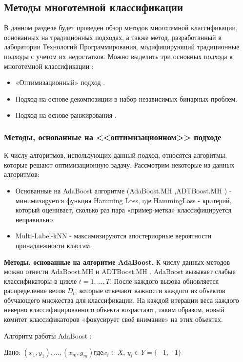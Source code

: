 \documentclass[russian, utf8, emptystyle]{eskdtext}
\begin{document}
\subsection{Методы многотемной классификации}
В данном разделе будет проведен обзор методов многотемной классификации, основанных на традиционных подходах, а также метод, разработанный в лаборатории Технологий Программирования, модифицирующий традиционные подходы с учетом их недостатков.
Можно выделить три основных подхода к многотемной классификации \cite{dis}:
\begin{itemize}
	\item «Оптимизационный» подход \cite{AdaBoost,ADT,mlKNN}.
	\item Подход на основе декомпозиции в набор независимых бинарных проблем. 
	\item Подход на основе ранжирования \cite{rank1,rank2}.
\end{itemize}
	\subsubsection{Методы, основанные на <<оптимизационном>> подходе}
К числу алгоритмов, использующих данный подход, относятся алгоритмы, которые решают оптимизационную задачу. Рассмотрим некоторые из данных алгоритмов:
\begin{itemize}
	\item Основанные на AdaBoost алгоритме (AdaBoost.MH \cite{AdaBoost},ADTBoost.MH \cite{ADT}) - минимизируется функция Hamming Loss, где HammingLoss - критерий, который   оценивает, сколько раз пара «пример-метка» классифицируется неправильно. 
	\item Multi-Label-kNN - \cite{kNN} максимизируются апостериорные вероятности принадлежности классам.
\end{itemize}
{\bf Методы, основанные на алгоритме AdaBoost.} К числу данных методов можно отнести AdaBoost.MH \cite{AdaBoost} и ADTBoost.MH \cite{ADT}.
AdaBoost вызывает слабые классификаторы в цикле  $t = 1,\ldots,T.$ После каждого вызова обновляется распределение весов $D_{t}$, которые отвечают важности каждого из объектов обучающего множества для классификации. На каждой итерации веса каждого неверно классифицированного объекта возрастают, таким образом, новый комитет классификаторов «фокусирует своё внимание» на этих объектах.

Алгоритм работы AdaBoost \cite{wikiAdaBoost}:

Дано: $(x_{1},y_{1}),\ldots,(x_{m},y_{m}) где x_{i} \in X,\, y_{i} \in Y = \{-1, +1\}$
\end{document}
